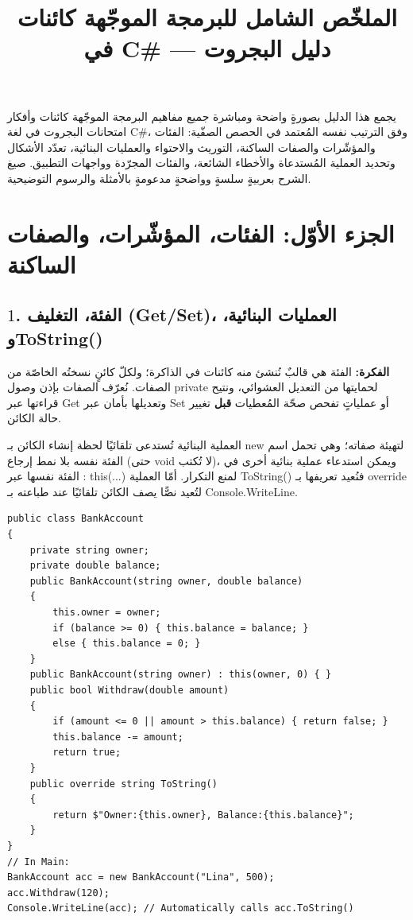 \documentclass[14pt]{extarticle}
\title{الملخّص الشامل للبرمجة الموجّهة كائنات في \textenglish{C\#} --- دليل البجروت}
\begin{document}
\maketitle
\thispagestyle{fancy}

\begin{boxDef}
يجمع هذا الدليل بصورةٍ واضحة ومباشرة جميع مفاهيم البرمجة الموجّهة كائنات وأفكار امتحانات البجروت في لغة \textenglish{C\#}، وفق الترتيب نفسه المُعتمد في الحصص الصفّية: الفئات والمؤشّرات والصفات الساكنة، التوريث والاحتواء والعمليات البنائية، تعدّد الأشكال وتحديد العملية المُستدعاة والأخطاء الشائعة، والفئات المجرّدة وواجهات التطبيق. صيغ الشرح بعربيةٍ سلسةٍ وواضحةٍ مدعومةٍ بالأمثلة والرسوم التوضيحية.
\end{boxDef}

\section*{الجزء الأوّل: الفئات، المؤشّرات، والصفات الساكنة}

\subsection*{$1$. الفئة، التغليف (\textenglish{Get}/\textenglish{Set})، العمليات البنائية، و\textenglish{ToString()}}
\textbf{الفكرة:} الفئة هي قالبٌ نُنشئ منه كائنات في الذاكرة؛ ولكلّ كائنٍ نسختُه الخاصّة من الصفات. نُعرّف الصفات بإذن وصول \textenglish{private} لحمايتها من التعديل العشوائي، ونتيح قراءتها عبر \textenglish{Get} وتعديلها بأمان عبر \textenglish{Set} أو عملياتٍ تفحص صحّة المُعطيات \textbf{قبل} تغيير حالة الكائن.

العملية البنائية تُستدعى تلقائيًا لحظة إنشاء الكائن بـ \textenglish{new} لتهيئة صفاته؛ وهي تحمل اسم الفئة نفسه بلا نمط إرجاع (حتى \textenglish{void} لا تُكتب)، ويمكن استدعاء عملية بنائية أخرى في الفئة نفسها عبر \textenglish{: this(...)} لمنع التكرار. أمّا العملية \textenglish{ToString()} فنُعيد تعريفها بـ \textenglish{override} لتُعيد نصًّا يصف الكائن تلقائيًا عند طباعته بـ \textenglish{Console.WriteLine}.

\begin{boxCode}
\begin{english}
\begin{verbatim}
public class BankAccount
{
    private string owner;
    private double balance;
    public BankAccount(string owner, double balance)
    {
        this.owner = owner;
        if (balance >= 0) { this.balance = balance; }
        else { this.balance = 0; }
    }
    public BankAccount(string owner) : this(owner, 0) { }
    public bool Withdraw(double amount)
    {
        if (amount <= 0 || amount > this.balance) { return false; }
        this.balance -= amount;
        return true;
    }
    public override string ToString()
    {
        return $"Owner:{this.owner}, Balance:{this.balance}";
    }
}
// In Main:
BankAccount acc = new BankAccount("Lina", 500);
acc.Withdraw(120);
Console.WriteLine(acc); // Automatically calls acc.ToString()
\end{verbatim}
\end{english}
\end{boxCode}
\end{document}
